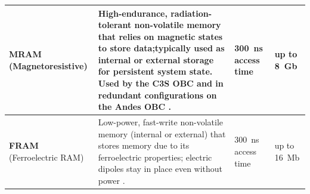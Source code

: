 \documentclass[10pt]{../datasheet}
\let\cite\citep
\begin{document}
\begin{longtable}{|p{2.8cm}|p{8.8cm}|p{2.1cm}|p{2.1cm}|}
  \textbf{MRAM} \newline (Magnetoresistive)                                                                                                                                                                                                                                                                                                    &
  High-endurance, radiation-tolerant non-volatile memory that relies on magnetic states to store data;typically used as internal or external storage for persistent system state. Used by the C3S OBC \cite[p.~229]{nasa_soa_2023} and in redundant configurations on the Andes OBC \cite[p.~232]{nasa_soa_2024} \cite[p.~230]{nasa_soa_2026}. &
  300~ns access time \cite[p.~224]{nasa_soa_2026}
                                                                                                                                                                                                                                                                                                                                               &
  up to 8~Gb \cite{avalanche_mram_endurance_2026}
  \\ \hline

  \textbf{FRAM} \newline (Ferroelectric RAM)                                                                                                                                                                                                                                                                                                   &
  Low-power, fast-write non-volatile memory (internal or external) that stores memory due to its ferroelectric properties; electric dipoles stay in place even without power \cite[p.~229]{nasa_soa_2023}.                                                                                                                                     &
  300~ns access time \cite[p.~224]{nasa_soa_2026}                                                                                                                                                                                                                                                                                              &
  up to 16~Mb \cite{avalanche_mram_endurance_2026}
  \\ \hline


\end{longtable}
\end{document}
